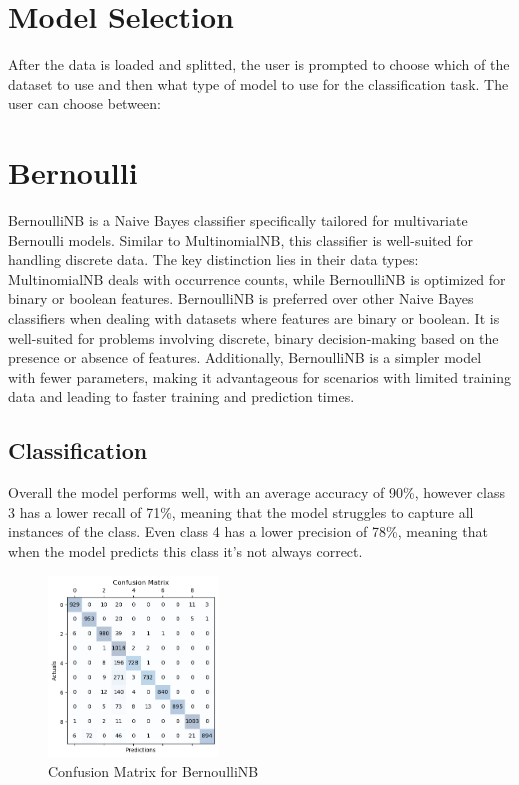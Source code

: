 \documentclass{article}
\begin{document}
\begin{titlepage}
  \section*{Model Selection}
  After the data is loaded and splitted, the user is prompted to choose which of the dataset to use and then what type of model to use for the classification task. The user can choose between:
  \section{Bernoulli}
  BernoulliNB is a Naive Bayes classifier specifically tailored for multivariate Bernoulli models. Similar to MultinomialNB, this classifier is well-suited for handling discrete data.
  \newline
  \newline
  The key distinction lies in their data types:
  MultinomialNB deals with occurrence counts, while BernoulliNB is optimized for binary or boolean features.
  BernoulliNB is preferred over other Naive Bayes classifiers when dealing with datasets where features are binary or boolean.
  \newline
  \newline
  It is well-suited for problems involving discrete, binary decision-making based on the presence or absence of features.
  Additionally, BernoulliNB is a simpler model with fewer parameters, making it advantageous for scenarios with limited training data and leading to faster training and prediction times.

  \subsection{Classification}
  Overall the model performs well, with an average accuracy of 90\%, however class 3 has a lower recall of 71\%, meaning that the model struggles to capture all instances of the class.
  \newline
  \newline
  Even class 4 has a lower precision of 78\%, meaning that when the model predicts this class it's not always correct.

  \begin{figure}[htbp]
    \centering
    \includegraphics[width=0.4\textwidth]{bernoulliCM.png}
    \caption{Confusion Matrix for BernoulliNB}
    \label{fig:sample}
  \end{figure}


\end{titlepage}
\end{document}
